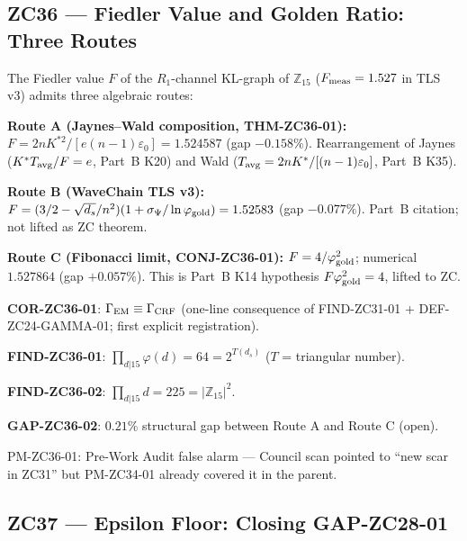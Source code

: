 \documentclass[11pt, a4paper]{article}
\newcommand{\Zft}{\mathbb{Z}_{15}}  %
\newcommand{\phig}{\varphi_{\rm gold}}
\newcommand{\Tavg}{T_{\rm avg}}
\newcommand{\Kstar}{K^*}
\begin{document}
\subsection{ZC36 --- Fiedler Value and Golden Ratio: Three Routes}

\begin{zcbox}[title={ZC36: THM-ZC36-01, CONJ-ZC36-01 ($F\phig^2=4$), COR-ZC36-01}]
\sloppy
The Fiedler value $F$ of the $R_1$-channel KL-graph of $\Zft$
($F_{\rm meas} = 1.527$ in TLS v3) admits three algebraic routes:

\textbf{Route A (Jaynes--Wald composition, THM-ZC36-01):}
$F = 2nK^{*2}/[e(n-1)\varepsilon_0] = 1.524587$ (gap $-0.158\%$).
Rearrangement of Jaynes ($\Kstar\Tavg/F = e$, Part~B K20) and
Wald ($\Tavg = 2n\Kstar/[(n-1)\varepsilon_0]$, Part~B K35).

\textbf{Route B (WaveChain TLS v3):}
$F = (3/2 - \sqrt{d_s}/n^2)(1+\sigma_\Psi/\ln\phig) = 1.52583$
(gap $-0.077\%$). Part~B citation; not lifted as ZC theorem.

\textbf{Route C (Fibonacci limit, CONJ-ZC36-01):}
$F = 4/\phig^2$; numerical $1.527864$ (gap $+0.057\%$).
This is Part~B K14 hypothesis $F\phig^2 = 4$, lifted to ZC.

\textbf{COR-ZC36-01}: $\Gamma_{\rm EM} \equiv \Gamma_{\rm CRF}$ (one-line
consequence of FIND-ZC31-01 + DEF-ZC24-GAMMA-01; first explicit registration).

\textbf{FIND-ZC36-01}: $\prod_{d|15}\varphi(d) = 64 = 2^{T(d_s)}$
($T$ = triangular number).

\textbf{FIND-ZC36-02}: $\prod_{d|15}d = 225 = |\Zft|^2$.

\textbf{GAP-ZC36-02}: $0.21\%$ structural gap between Route A and Route C (open).

PM-ZC36-01: Pre-Work Audit false alarm --- Council scan pointed to
``new scar in ZC31'' but PM-ZC34-01 already covered it in the parent.
\end{zcbox}

\subsection{ZC37 --- Epsilon Floor: Closing GAP-ZC28-01}
\end{document}
